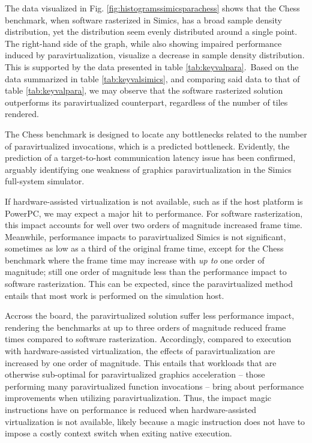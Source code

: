 The data visualized in Fig. \ref{fig:histogramssimicsparachess} shows that the Chess benchmark, when software rasterized in Simics, has a broad sample density distribution, yet the distribution seem evenly distributed around a single point.
The right-hand side of the graph, while also showing impaired performance induced by paravirtualization, visualize a decrease in sample density distribution.
This is supported by the data presented in table \ref{tab:keyvalpara}.\
Based on the data summarized in table \ref{tab:keyvalsimics}, and comparing said data to that of table \ref{tab:keyvalpara}, we may observe that the software rasterized solution outperforms its paravirtualized counterpart, regardless of the number of tiles rendered.

The Chess benchmark is designed to locate any bottlenecks related to the number of paravirtualized invocations, which is a predicted bottleneck.
Evidently, the prediction of a target-to-host communication latency issue has been confirmed, arguably identifying one weakness of graphics paravirtualization in the Simics full-system simulator.

If hardware-assisted virtualization is not available, such as if the host platform is PowerPC, we may expect a major hit to performance.
For software rasterization, this impact accounts for well over two orders of magnitude increased frame time.
Meanwhile, performance impacts to paravirtualized Simics is not significant, sometimes as low as a third of the original frame time, except for the Chess benchmark where the frame time may increase with \textit{up to} one order of magnitude; still one order of magnitude less than the performance impact to software rasterization.
This can be expected, since the paravirtualized method entails that most work is performed on the simulation host.

Accross the board, the paravirtualized solution suffer less performance impact, rendering the benchmarks at up to three orders of magnitude reduced frame times compared to software rasterization.
Accordingly, compared to execution with hardware-assisted virtualization, the effects of paravirtualization are increased by one order of magnitude.
This entails that workloads that are otherwise sub-optimal for paravirtualized graphics acceleration -- those performing many paravirtualized function invocations -- bring about performance improvements when utilizing paravirtualization.
Thus, the impact magic instructions have on performance is reduced when hardware-assisted virtualization is not available, likely because a magic instruction does not have to impose a costly context switch when exiting native execution.

